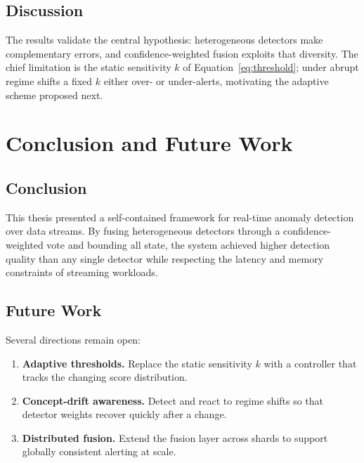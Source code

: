 \documentclass[12pt,a4paper,oneside]{report}
\begin{document}
\section{Discussion}
\label{sec:res-discussion}
The results validate the central hypothesis: heterogeneous detectors make
complementary errors, and confidence-weighted fusion exploits that diversity.
The chief limitation is the static sensitivity $k$ of
Equation~\eqref{eq:threshold}; under abrupt regime shifts a fixed $k$ either
over- or under-alerts, motivating the adaptive scheme proposed next.

\chapter{Conclusion and Future Work}
\label{ch:conclusion}

\section{Conclusion}
\label{sec:conc-summary}
This thesis presented a self-contained framework for real-time anomaly
detection over data streams. By fusing heterogeneous detectors through a
confidence-weighted vote and bounding all state, the system achieved higher
detection quality than any single detector while respecting the latency and
memory constraints of streaming workloads.

\section{Future Work}
\label{sec:conc-future}
Several directions remain open:
\begin{enumerate}[leftmargin=2em]
  \item \textbf{Adaptive thresholds.} Replace the static sensitivity $k$ with a
        controller that tracks the changing score distribution.
  \item \textbf{Concept-drift awareness.} Detect and react to regime shifts so
        that detector weights recover quickly after a change.
  \item \textbf{Distributed fusion.} Extend the fusion layer across shards to
        support globally consistent alerting at scale.
\end{enumerate}
\end{document}
